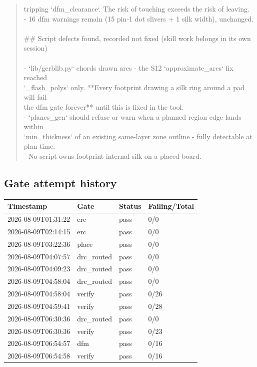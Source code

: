 \documentclass[11pt,a4paper]{article}
\begin{document}
\begin{quote}
  tripping `dfm\_clearance`. The risk of touching exceeds the risk of leaving.\\
- 16 dfm warnings remain (15 pin-1 dot slivers + 1 silk width), unchanged.\\
~\\
\#\# Script defects found, recorded not fixed (skill work belongs in its own session)\\
~\\
- `lib/gerblib.py` chords drawn arcs - the S12 `approximate\_arcs` fix reached\\
  `\_flash\_polys` only. {*}{*}Every footprint drawing a silk ring around a pad will fail\\
  the dfm gate forever{*}{*} until this is fixed in the tool.\\
- `planes\_gen` should refuse or warn when a planned region edge lands within\\
  `min\_thickness` of an existing same-layer zone outline - fully detectable at plan time.\\
- No script owns footprint-internal silk on a placed board.
\end{quote}
\subsection*{Gate attempt history}
{\small
\begin{longtable}{llll}
\toprule
\textbf{Timestamp} & \textbf{Gate} & \textbf{Status} & \textbf{Failing/Total} \\
\midrule
\endhead
2026-08-09T01:31:22 & erc & pass & 0/0 \\
2026-08-09T02:14:15 & erc & pass & 0/0 \\
2026-08-09T03:22:36 & place & pass & 0/0 \\
2026-08-09T04:07:57 & drc\_routed & pass & 0/0 \\
2026-08-09T04:09:23 & drc\_routed & pass & 0/0 \\
2026-08-09T04:58:04 & drc\_routed & pass & 0/0 \\
2026-08-09T04:58:04 & verify & pass & 0/26 \\
2026-08-09T04:59:41 & verify & pass & 0/28 \\
2026-08-09T06:30:36 & drc\_routed & pass & 0/0 \\
2026-08-09T06:30:36 & verify & pass & 0/23 \\
2026-08-09T06:54:57 & dfm & pass & 0/16 \\
2026-08-09T06:54:58 & verify & pass & 0/16 \\
\bottomrule
\end{longtable}
}
\end{document}
